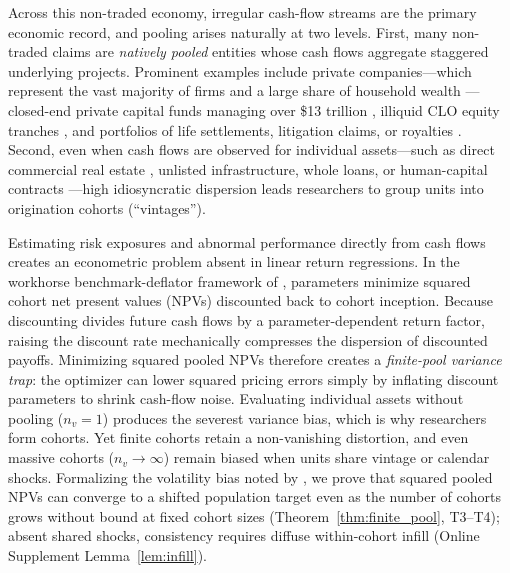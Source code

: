 \documentclass[12pt]{article}
\begin{document}
Across this non-traded economy, irregular cash-flow streams are the primary economic record, and pooling arises naturally at two levels.
First, many non-traded claims are \emph{natively pooled} entities whose cash flows aggregate staggered underlying projects.
Prominent examples include private companies---which represent the vast majority of firms and a large share of household wealth \citep{MV02}---closed-end private capital funds managing over \$13 trillion \citep{McKinsey2024,DLP12,farrelly2019risk,andonov2021institutional,riddiough2022private,erel2024risk,jeffers2024risk}, illiquid CLO equity tranches \citep{cordell2023clo}, and portfolios of life settlements, litigation claims, or royalties \citep{BGS12}.
Second, even when cash flows are observed for individual assets---such as direct commercial real estate \citep{lee2019new}, unlisted infrastructure, whole loans, or human-capital contracts \citep{kroencke2013return}---high idiosyncratic dispersion leads researchers to group units into origination cohorts (``vintages'').

Estimating risk exposures and abnormal performance directly from cash flows creates an econometric problem absent in linear return regressions.
In the workhorse benchmark-deflator framework of \citet{DLP12}, parameters minimize squared cohort net present values (NPVs) discounted back to cohort inception.
Because discounting divides future cash flows by a parameter-dependent return factor, raising the discount rate mechanically compresses the dispersion of discounted payoffs.
Minimizing squared pooled NPVs therefore creates a \emph{finite-pool variance trap}: the optimizer can lower squared pricing errors simply by inflating discount parameters to shrink cash-flow noise.
Evaluating individual assets without pooling ($n_v = 1$) produces the severest variance bias, which is why researchers form cohorts.
Yet finite cohorts retain a non-vanishing distortion, and even massive cohorts ($n_v \to \infty$) remain biased when units share vintage or calendar shocks.
Formalizing the volatility bias noted by \citet[p.~517 fn.~8; Table~1, p.~522]{DLP12}, we prove that squared pooled NPVs can converge to a shifted population target even as the number of cohorts grows without bound at fixed cohort sizes (Theorem~\ref{thm:finite_pool}, T3--T4); absent shared shocks, consistency requires diffuse within-cohort infill (Online Supplement Lemma~\ref{lem:infill}).
\end{document}
